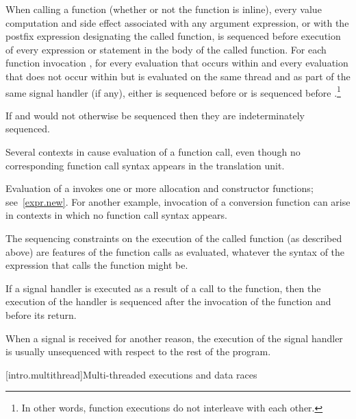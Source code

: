 \pnum
When calling a function (whether or not the function is inline), every
%
value computation and
%
side effect associated with any argument
expression, or with the postfix expression designating the called
function, is sequenced before execution of every expression or statement
in the body of the called function.
For each function invocation ,
for every evaluation  that occurs within  and
every evaluation  that does not occur within  but
is evaluated on the same thread and as part of the same signal handler (if any),
either  is sequenced before  or
 is sequenced before .\footnote{In other words,
function executions do not interleave with each other.}
\begin{note}
If  and  would not otherwise be sequenced then they are
indeterminately sequenced.
\end{note}
Several contexts in \Cpp{} cause evaluation of a function call, even
though no corresponding function call syntax appears in the translation
unit.
\begin{example}
Evaluation of a  invokes one or more allocation
and constructor functions; see~\ref{expr.new}. For another example,
invocation of a conversion function can arise in
contexts in which no function call syntax appears.
\end{example}
The sequencing constraints on the execution of the called function (as
described above) are features of the function calls as evaluated,
whatever the syntax of the expression that calls the function might be.%
%

%
%
\pnum
If a signal handler is executed as a result of a call to the 
function, then the execution of the handler is sequenced after the invocation
of the  function and before its return.
\begin{note} When a signal is received for another reason, the execution of the
signal handler is usually unsequenced with respect to the rest of the program.
\end{note}

[intro.multithread]{Multi-threaded executions and data races}

